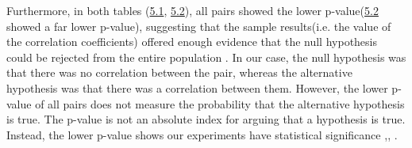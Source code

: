 \documentclass[logo,bsc,singlespacing,parskip]{infthesis}
\begin{document}
Furthermore, in both tables (\hyperref[tab:all_qqq_corr1]{5.1}, \hyperref[tab:all_qqq_corr2]{5.2}), all pairs showed the lower p-value(\hyperref[tab:all_qqq_corr2]{5.2} showed a far lower p-value), suggesting that the sample results(i.e. the value of the correlation coefficients) offered enough evidence that the null hypothesis could be rejected from the entire population \cite{MinitabBlog2014}.  In our case, the null hypothesis was that there was no correlation between the pair, whereas the alternative hypothesis was that there was a correlation between them. However, the lower p-value of all pairs does not measure the probability that the alternative hypothesis is true. The p-value is not an absolute index for arguing that a hypothesis is true. Instead, the lower p-value shows our experiments have statistical significance \cite{FrostPValues},\cite{ASAStatement2016}, \cite{Park2016}.
\end{document}
